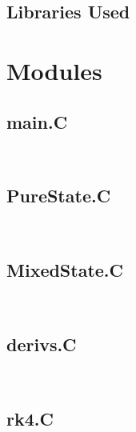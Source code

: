 \subsection{Libraries Used}



\section{Modules}

\subsection{main.C}

\texttt{
\sloppy
\small
}

\subsection{PureState.C}

\texttt{
\sloppy
\small
}

\subsection{MixedState.C}

\texttt{
\sloppy
\small
}

\subsection{derivs.C}

\texttt{
\sloppy
\small
}

\subsection{rk4.C}


